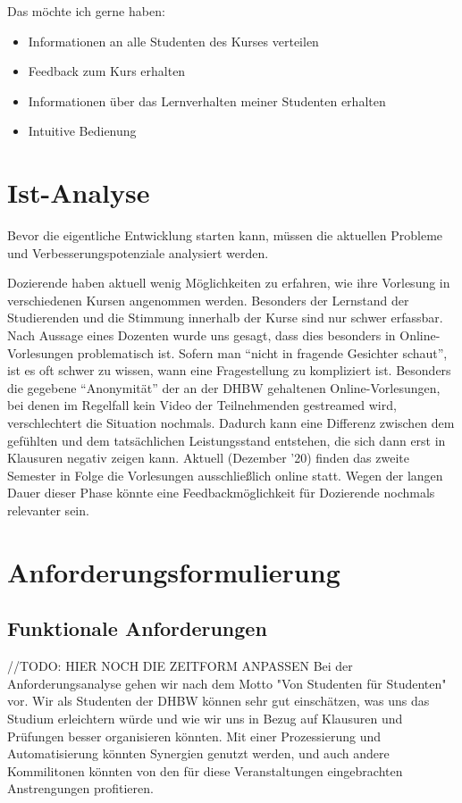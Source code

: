 Das möchte ich gerne haben:
\begin{itemize}
	\item Informationen an alle Studenten des Kurses verteilen
	\item Feedback zum Kurs erhalten
	\item Informationen über das Lernverhalten meiner Studenten erhalten
	\item Intuitive Bedienung
\end{itemize}

\section{Ist-Analyse}
Bevor die eigentliche Entwicklung starten kann, müssen die aktuellen Probleme und Verbesserungspotenziale analysiert werden.

Dozierende haben aktuell wenig Möglichkeiten zu erfahren, wie ihre Vorlesung in verschiedenen Kursen angenommen werden.
Besonders der Lernstand der Studierenden und die Stimmung innerhalb der Kurse sind nur schwer erfassbar.
Nach Aussage eines Dozenten wurde uns gesagt, dass dies besonders in Online-Vorlesungen problematisch ist.
Sofern man \enquote{nicht in fragende Gesichter schaut}, ist es oft schwer zu wissen, wann eine Fragestellung zu kompliziert ist.
Besonders die gegebene \enquote{Anonymität} der an der DHBW gehaltenen Online-Vorlesungen, bei denen im Regelfall kein Video der Teilnehmenden gestreamed wird, verschlechtert die Situation nochmals.
Dadurch kann eine Differenz zwischen dem gefühlten und dem tatsächlichen Leistungsstand entstehen, die sich dann erst in Klausuren negativ zeigen kann.
Aktuell (Dezember '20) finden das zweite Semester in Folge die Vorlesungen ausschließlich online statt. Wegen  der langen Dauer dieser Phase könnte eine Feedbackmöglichkeit für Dozierende nochmals relevanter sein.

\section{Anforderungsformulierung}

\subsection{Funktionale Anforderungen} //TODO: HIER NOCH DIE ZEITFORM ANPASSEN
Bei der Anforderungsanalyse gehen wir nach dem Motto "Von Studenten für Studenten" vor. Wir als Studenten der DHBW können sehr gut einschätzen, was uns das Studium erleichtern würde und wie wir uns in Bezug auf Klausuren und Prüfungen besser organisieren könnten. Mit einer Prozessierung und Automatisierung könnten Synergien genutzt werden, und auch andere Kommilitonen könnten von den für diese Veranstaltungen eingebrachten Anstrengungen profitieren.

